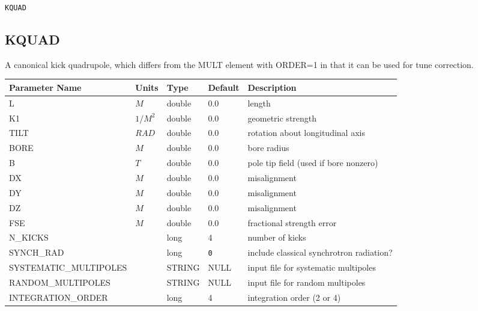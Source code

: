 \begin{latexonly}
\newpage
\begin{center}{\Large\verb|KQUAD|}\end{center}
\end{latexonly}\subsection{KQUAD}
A canonical kick quadrupole, which differs from the MULT element with ORDER=1 in
that it can be used for tune correction.
\\
\begin{tabular}{|l|l|l|l|p{\descwidth}|} \hline
Parameter Name & Units & Type & Default & Description \\ \hline 
L & $M$ & double &  0.0 & length  \\ \hline 
K1 & $1/M^{2}$ & double &  0.0 & geometric strength  \\ \hline 
TILT & $RAD$ & double &  0.0 & rotation about longitudinal axis  \\ \hline 
BORE & $M$ & double &  0.0 & bore radius  \\ \hline 
B & $T$ & double &  0.0 & pole tip field (used if bore nonzero)  \\ \hline 
DX & $M$ & double &  0.0 & misalignment  \\ \hline 
DY & $M$ & double &  0.0 & misalignment  \\ \hline 
DZ & $M$ & double &  0.0 & misalignment  \\ \hline 
FSE & $M$ & double &  0.0 & fractional strength error  \\ \hline 
N\_KICKS &  & long &   4               & number of kicks  \\ \hline 
SYNCH\_RAD &  & long &  \verb|0| & include classical synchrotron radiation?  \\ \hline 
SYSTEMATIC\_MULTIPOLES &  & STRING &   NULL            & input file for systematic multipoles  \\ \hline 
RANDOM\_MULTIPOLES &  & STRING &   NULL            & input file for random multipoles  \\ \hline 
INTEGRATION\_ORDER &  & long &   4               & integration order (2 or 4)  \\ \hline 
\end{tabular}

